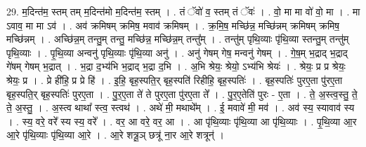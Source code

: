 \documentclass[17pt]{extarticle}
\begin{document}
29. म॒दिन्त॑म॒ स्तम् तम् म॒दिन्त॑मो म॒दिन्त॑म॒ स्तम् । . तं ॅवो॑ व॒ स्तम् तं ॅवः॑ । . वो॒ मा मा वो॑ वो॒ मा । . मा ऽवाव॒ मा मा ऽव॑ । . अव॑ क्रमिषम् क्रमिष॒ मवाव॑ क्रमिषम् । . क्र॒मि॒ष॒ मच्छि॑न्न॒ मच्छि॑न्नम् क्रमिषम् क्रमिष॒ मच्छि॑न्नम् । . अच्छि॑न्न॒म् तन्तु॒म् तन्तु॒ मच्छि॑न्न॒ मच्छि॑न्न॒म् तन्तु᳚म् । . तन्तु॑म् पृथि॒व्याः पृ॑थि॒व्या स्तन्तु॒म् तन्तु॑म् पृथि॒व्याः । . पृ॒थि॒व्या अन्वनु॑ पृथि॒व्याः पृ॑थि॒व्या अनु॑ । . अनु॑ गेषम् गेष॒ मन्वनु॑ गेषम् । . गे॒ष॒म् भ॒द्राद् भ॒द्राद् गे॑षम् गेषम् भ॒द्रात् । . भ॒द्रा द॒भ्य॑भि भ॒द्राद् भ॒द्रा द॒भि । . अ॒भि श्रेयः॒ श्रेयो॒ ऽभ्य॑भि श्रेयः॑ । . श्रेयः॒ प्र प्र श्रेयः॒ श्रेयः॒ प्र । . प्रे ही॑हि॒ प्र प्रे हि॑ । . इ॒हि॒ बृह॒स्पति॒र् बृह॒स्पति॑ रिहीहि॒ बृह॒स्पतिः॑ । . बृह॒स्पतिः॑ पुरए॒ता पु॑रए॒ता बृह॒स्पति॒र् बृह॒स्पतिः॑ पुरए॒ता । . पु॒र॒ए॒ता ते॑ ते पुरए॒ता पु॑रए॒ता ते᳚ । . पु॒र॒ए॒तेति॑ पुरः - ए॒ता । . ते॒ अ॒स्त्व॒स्तु॒ ते॒ ते॒ अ॒स्तु॒ । . अ॒स्त्व थाथा᳚ स्त्व॒ स्त्वथ॑ । . अथे॑ मी॒ मथाथे᳚म् । . ई॒ मवावे॑ मी॒ मव॑ । . अव॑ स्य॒ स्यावाव॑ स्य । . स्य॒ वरे॒ वरे᳚ स्य स्य॒ वरे᳚ । . वर॒ आ वरे॒ वर॒ आ । . आ पृ॑थि॒व्याः पृ॑थि॒व्या आ पृ॑थि॒व्याः । . पृ॒थि॒व्या आ॒र आ॒रे पृ॑थि॒व्याः पृ॑थि॒व्या आ॒रे । . आ॒रे शत्रू॒ञ् छत्रू॑ ना॒र आ॒रे शत्रून्॑ । \newline
\end{document}

